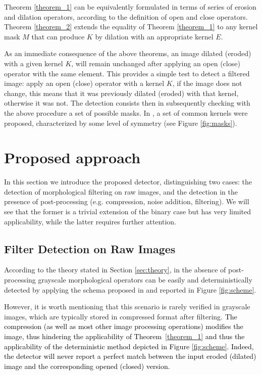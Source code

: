 \documentclass{ieeeaccess}
\newcommand{\revisedtext}[1]{\textcolor{black}{#1}}
\begin{document}
Theorem \ref{theorem_1} can be equivalently formulated in terms of series of erosion and dilation operators, according to the definition of open and close operators. Theorem \ref{theorem_2} extends the equality of Theorem \ref{theorem_1} to any kernel mask $M$ that can produce $K$ by dilation with an appropriate kernel $E$.

As an immediate consequence of the above theorems, an image dilated (eroded) with a given kernel $K$, will remain unchanged after applying an open (close) operator with the same element. This provides a simple test to detect a filtered image: apply an open (close) operator with a kernel $K$, if the image does not change, this means that it was previously dilated (eroded) with that kernel, otherwise it was not. The detection consists then in subsequently checking with the above procedure a set of possible masks. In \cite{de2017detecting}, a set of common kernels were proposed, characterized by some level of symmetry (see Figure \ref{fig:masks}).



\section{Proposed approach}
\label{sec:method}

In this section we introduce the proposed detector, distinguishing two cases: the detection of morphological filtering on raw images, and the detection in the presence of post-processing (e.g. compression, noise addition, filtering). We will see that the former is a trivial extension of the binary case but has very limited applicability, while the latter requires further attention.



\subsection{Filter Detection on Raw Images}

According to the theory stated in Section \ref{sec:theory}, in the absence of post-processing grayscale morphological operators can be easily and deterministically detected by applying the schema proposed in 
\cite{de2017detecting} and reported in Figure \ref{fig:scheme}.

However, it is worth mentioning that this scenario is rarely verified in grayscale images, which are typically stored in compressed format after filtering. \revisedtext{The compression (as well as most other image processing operations)  modifies the image, thus hindering the applicability of Theorem~\ref{theorem_1} and thus the applicability of the deterministic method depicted in Figure \ref{fig:scheme}. Indeed, the detector will never report a perfect match between the input eroded (dilated) image and the corresponding opened (closed) version.}
\end{document}
